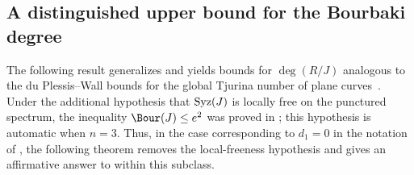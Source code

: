 \documentclass[11pt]{amsart} %
\theoremstyle{definition}
\def\syz{\mbox{\rm Syz}}
\begin{document}
\subsection{A distinguished upper bound for the Bourbaki degree}
The following result generalizes \cite[Theorem~2.10]{MAA} and yields bounds
for $\deg(R/J)$ analogous to the du Plessis--Wall bounds for the global
Tjurina number of plane curves~\cite[Theorem 3.2]{CTC-Plessis}. Under the additional
hypothesis that $\syz(J)$ is locally free on the punctured spectrum, the
inequality $\Bour(J)\le e^2$ was proved in \cite[Theorem~3.3]{MFA}; this
hypothesis is automatic when $n=3$. Thus, in the case corresponding to
$d_1=0$ in the notation of \cite{MFA}, the following theorem removes the
local-freeness hypothesis and gives an affirmative answer to
\cite[Question~3.4]{MFA} within this subclass.
\end{document}

